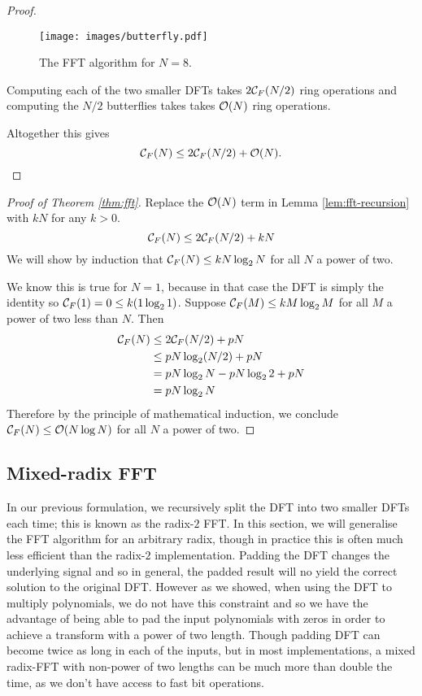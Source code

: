 \begin{proof}
    \begin{figure}[t]
        \centering
        \texttt{[image: images/butterfly.pdf]}
        \caption{The FFT algorithm for $N = 8$.}
        \label{fig:butterflies}
    \end{figure}

    Computing each of the two smaller DFTs takes $2\mathcal C_F(N/2)$ ring operations and computing the $N/2$ butterflies takes takes $\mathcal O(N)$ ring operations.

    Altogether this gives
    \[
        \mathcal C_F(N) \le 2 \mathcal C_F(N/2) + \mathcal O(N).
    \]
\end{proof}

\begin{proof}[Proof of Theorem \ref{thm:fft}]

    Replace the $\mathcal O(N)$ term in Lemma \ref{lem:fft-recursion} with $kN$ for any $k > 0$.
    \[
        \mathcal C_F(N) \le 2 \mathcal C_F(N/2) + kN
    \]
    We will show by induction that $\mathcal C_F(N) \le kN\log_2 N$ for all $N$ a power of two.

    We know this is true for $N = 1$, because in that case the DFT is simply the identity so $\mathcal C_F(1) = 0 \le k(1 \log_2 1)$.
    Suppose $\mathcal C_F(M) \le kM\log_2 M$ for all $M$ a power of two less than $N$. Then
    \begin{align*}
        \mathcal C_F(N)
        &\le 2\mathcal C_F(N/2) + pN\\
        &\le pN\log_2 (N/2) + pN\\
        &= pN\log_2 N - pN\log_2 2 + pN\\
        &= pN\log_2 N
    \end{align*}
    Therefore by the principle of mathematical induction, we conclude $\mathcal C_F(N) \le \mathcal O(N \log N)$ for all $N$ a power of two.
\end{proof}


\subsection{Mixed-radix FFT}

In our previous formulation, we recursively split the DFT into two smaller DFTs each time; this is known as the radix-$2$ FFT. In this section, we will generalise the FFT algorithm for an arbitrary radix, though in practice this is often much less efficient than the radix-$2$ implementation. Padding the DFT changes the underlying signal and so in general, the padded result will no yield the correct solution to the original DFT. However as we showed, when using the DFT to multiply polynomials, we do not have this constraint and so we have the advantage of being able to pad the input polynomials with zeros in order to achieve a transform with a power of two length. Though padding DFT can become twice as long in each of the inputs, but in most implementations, a mixed radix-FFT with non-power of two lengths can be much more than double the time, as we don't have access to fast bit operations.

